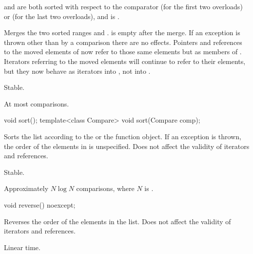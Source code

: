 \begin{itemdescr}
\pnum
\expects
{} and  are both sorted with respect to
the comparator  (for the first two overloads) or
 (for the last two overloads), and
 is .

\pnum
\effects
Merges the two sorted ranges  and
.  is empty after the merge. If an
exception is thrown other than by a comparison there are no effects.
Pointers and references to the moved elements of  now refer to those same elements
but as members of . Iterators referring to the moved elements will continue to
refer to their elements, but they now behave as iterators into , not into
.

\pnum
\remarks
Stable.

\pnum
\complexity
At most  comparisons.
\end{itemdescr}

%
\begin{itemdecl}
void sort();
template<class Compare> void sort(Compare comp);
\end{itemdecl}

\begin{itemdescr}
\pnum
\effects
Sorts the list according to the  or the  function object.
If an exception is thrown, the order of the elements in  is unspecified.
Does not affect the validity of iterators and references.

\pnum
\remarks
Stable.

\pnum
\complexity
Approximately $N \log N$ comparisons, where $N$ is .
\end{itemdescr}

%
\begin{itemdecl}
void reverse() noexcept;
\end{itemdecl}

\begin{itemdescr}
\pnum
\effects
Reverses the order of the elements in the list.
Does not affect the validity of iterators and references.

\pnum
\complexity
Linear time.
\end{itemdescr}

